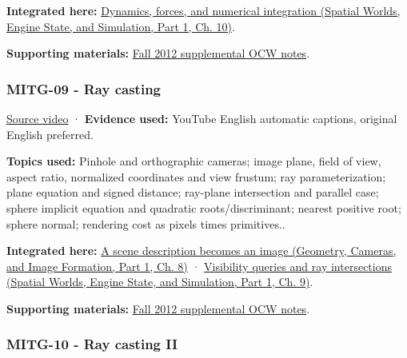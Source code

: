 \textbf{Integrated here:} \href{../05-Spatial-Worlds-Engine-State-and-Simulation-P01/main.pdf\#04-visual-computing-ii-ch029-dynamics-forces-and-numerical-integration}{Dynamics, forces, and numerical integration (Spatial Worlds, Engine State, and Simulation, Part 1, Ch. 10)}.

\textbf{Supporting materials:} \href{https://ocw.mit.edu/courses/6-837-computer-graphics-fall-2012/pages/lecture-notes/}{Fall 2012 supplemental OCW notes}.

\subsubsection{MITG-09 - Ray casting}\label{04-visual-computing-ii-ch036-mitg-09---ray-casting}

\hypertarget{04-visual-computing-ii-ch036-mitg-09---ray-casting}{}

\href{https://www.youtube.com/watch?v=mJHGcDc37kY}{Source video} · \textbf{Evidence used:} YouTube English automatic captions, original English preferred.

\textbf{Topics used:} Pinhole and orthographic cameras; image plane, field of view, aspect ratio, normalized coordinates and view frustum; ray parameterization; plane equation and signed distance; ray-plane intersection and parallel case; sphere implicit equation and quadratic roots/discriminant; nearest positive root; sphere normal; rendering cost as pixels times primitives..

\textbf{Integrated here:} \href{../03-Geometry-Cameras-and-Image-Formation-P01/main.pdf\#03-visual-computing-i-ch001-a-scene-description-becomes-an-image}{A scene description becomes an image (Geometry, Cameras, and Image Formation, Part 1, Ch. 8)} · \href{../05-Spatial-Worlds-Engine-State-and-Simulation-P01/main.pdf\#04-visual-computing-ii-ch028-visibility-queries-and-ray-intersections-1}{Visibility queries and ray intersections (Spatial Worlds, Engine State, and Simulation, Part 1, Ch. 9)}.

\textbf{Supporting materials:} \href{https://ocw.mit.edu/courses/6-837-computer-graphics-fall-2012/pages/lecture-notes/}{Fall 2012 supplemental OCW notes}.

\subsubsection{MITG-10 - Ray casting II}\label{04-visual-computing-ii-ch036-mitg-10---ray-casting-ii}

\hypertarget{04-visual-computing-ii-ch036-mitg-10---ray-casting-ii}{}

